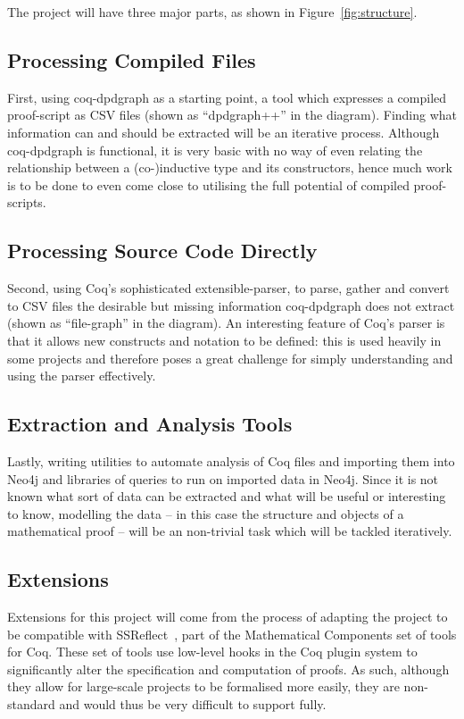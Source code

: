 \documentclass[12pt,a4paper]{article}
\begin{document}
The project will have three major parts, as shown in Figure~\ref{fig:structure}.

\subsection*{Processing Compiled Files}
First, using coq-dpdgraph as a starting point, a tool which expresses a
compiled proof-script as CSV files (shown as ``dpdgraph++'' in the diagram).
Finding what information can and should be extracted will be an iterative
process. Although coq-dpdgraph is functional, it is very basic with no way of
even relating the relationship between a (co-)inductive type and its
constructors, hence much work is to be done to even come close to utilising the
full potential of compiled proof-scripts.

\subsection*{Processing Source Code Directly}
Second, using Coq's sophisticated extensible-parser, to parse, gather and
convert to CSV files the desirable but missing information
coq-dpdgraph does not extract (shown as ``file-graph'' in the diagram). An
interesting feature of Coq's parser is that it allows new constructs and
notation to be defined: this is used heavily in some projects and therefore
poses a great challenge for simply understanding and using the parser
effectively.

\subsection*{Extraction and Analysis Tools}
Lastly, writing utilities to automate analysis of Coq files and importing them into
Neo4j and libraries of queries to run on imported data in Neo4j. Since it is not
known what sort of data can be extracted and what will be useful or interesting to
know, modelling the data -- in this case the structure and objects of a mathematical
proof -- will be an non-trivial task which will be tackled iteratively.

\subsection*{Extensions}

Extensions for this project will come from the process of adapting the project to
be compatible with SSReflect~\cite{gonthier2015ssr}, part of the Mathematical
Components set of tools for Coq. These set of tools use low-level hooks in the
Coq plugin system to significantly alter the specification and computation of
proofs. As such, although they allow for large-scale projects to be formalised
more easily, they are non-standard and would thus be very difficult to support
fully.
\end{document}
